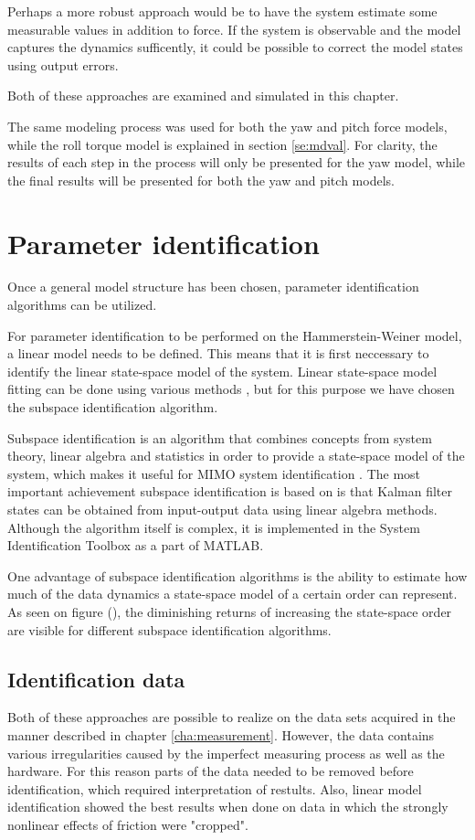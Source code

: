 Perhaps a more robust approach would be to have the system estimate some measurable values in addition to force.
If the system is observable and the model captures the dynamics sufficently, it could be possible to correct the model states using output errors.

Both of these approaches are examined and simulated in this chapter.

The same modeling process was used for both the yaw and pitch force models, while the roll torque model is explained in section \ref{se:mdval}.
For clarity, the results of each step in the process will only be presented for the yaw model, while the final results will be presented for both the yaw and pitch models. 

\section{Parameter identification}
Once a general model structure has been chosen, parameter identification algorithms can be utilized.

For parameter identification to be performed on the Hammerstein-Weiner model, a linear model needs to be defined.
This means that it is first neccessary to identify the linear state-space model of the system.
Linear state-space model fitting can be done using various methods , but for this purpose we have chosen the subspace identification algorithm.

Subspace identification is an algorithm that combines concepts from system theory, linear algebra and statistics in order to provide a state-space model of the system, which makes it useful for MIMO system identification \cite{van2012subspace}. 
The most important achievement subspace identification is based on is that Kalman filter states can be obtained from input-output data using linear algebra methods.
Although the algorithm itself is complex, it is implemented in the System Identification Toolbox as a part of MATLAB.

One advantage of subspace identification algorithms is the ability to estimate how much of the data dynamics a state-space model of a certain order can represent. 
As seen on figure (), the diminishing returns of increasing the state-space order are visible for different subspace identification algorithms.


\subsection{Identification data}
Both of these approaches are possible to realize on the data sets acquired in the manner described in chapter \ref{cha:measurement}.
However, the data contains various irregularities caused by the imperfect measuring process as well as the hardware.
For this reason parts of the data needed to be removed before identification, which required interpretation of restults.
Also, linear model identification showed the best results when done on data in which the strongly nonlinear effects of friction were "cropped".

